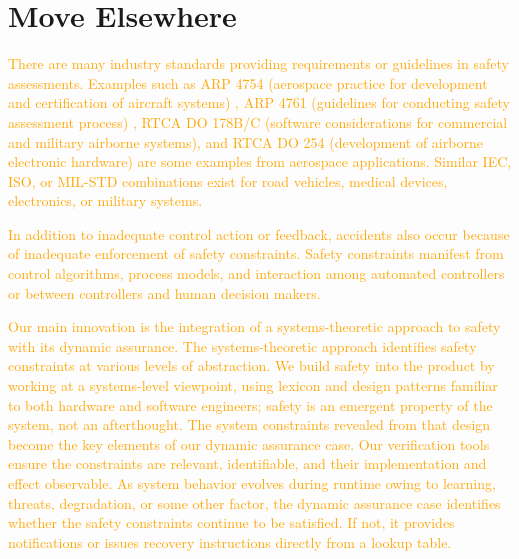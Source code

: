 \newpage
\section{Move Elsewhere}


\textcolor{orange}{There are many industry standards providing requirements or guidelines in safety assessments. Examples such as ARP 4754 (aerospace practice for development and certification of aircraft systems) \cite{ARP4754}, ARP 4761 (guidelines for conducting safety assessment process) \cite{ARP4761}, RTCA DO 178B/C (software considerations for commercial and military airborne systems), and RTCA DO 254 (development of airborne electronic hardware) are some examples from aerospace applications.  Similar IEC, ISO, or MIL-STD combinations exist for road vehicles, medical devices, electronics, or military systems.}

\textcolor{orange}{In addition to inadequate control action or feedback, accidents also occur because of inadequate enforcement of safety constraints.  Safety constraints manifest from control algorithms, process models, and interaction among automated controllers or between controllers and human decision makers.  
}

\textcolor{orange}{Our main innovation is the integration of a systems-theoretic approach to safety with its dynamic assurance.  The systems-theoretic approach identifies safety constraints at various levels of abstraction.  We build safety into the product by working at a systems-level viewpoint, using lexicon and design patterns familiar to both hardware and software engineers; safety is an emergent property of the system, not an afterthought.  The system constraints revealed from that design become the key elements of our dynamic assurance case.  Our verification tools ensure the constraints are relevant, identifiable, and their implementation and effect observable.  As system behavior evolves during runtime owing to learning, threats, degradation, or some other factor, the dynamic assurance case identifies whether the safety constraints continue to be satisfied.  If not, it provides notifications or issues recovery instructions directly from a lookup table.}


